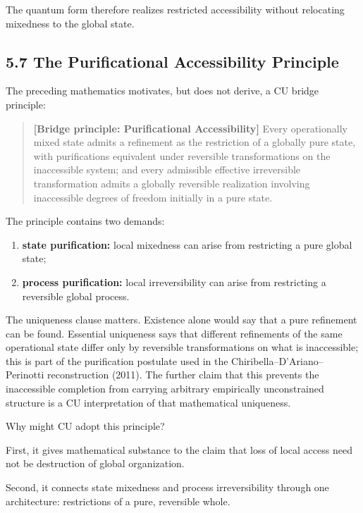 \documentclass[
  11pt,
]{article}
\providecommand{\tightlist}{%
  \setlength{\itemsep}{0pt}\setlength{\parskip}{0pt}}
\begin{document}
The quantum form therefore realizes restricted accessibility without
relocating mixedness to the global state.

\subsection{5.7 The Purificational Accessibility
Principle}\label{the-purificational-accessibility-principle}

The preceding mathematics motivates, but does not derive, a CU bridge
principle:

\begin{quote}
\textbf{{[}Bridge principle: Purificational Accessibility{]}} Every
operationally mixed state admits a refinement as the restriction of a
globally pure state, with purifications equivalent under reversible
transformations on the inaccessible system; and every admissible
effective irreversible transformation admits a globally reversible
realization involving inaccessible degrees of freedom initially in a
pure state.
\end{quote}

The principle contains two demands:

\begin{enumerate}
\def\labelenumi{\arabic{enumi}.}
\tightlist
\item
  \textbf{state purification:} local mixedness can arise from
  restricting a pure global state;
\item
  \textbf{process purification:} local irreversibility can arise from
  restricting a reversible global process.
\end{enumerate}

The uniqueness clause matters. Existence alone would say that a pure
refinement can be found. Essential uniqueness says that different
refinements of the same operational state differ only by reversible
transformations on what is inaccessible; this is part of the
purification postulate used in the Chiribella--D'Ariano--Perinotti
reconstruction (2011). The further claim that this prevents the
inaccessible completion from carrying arbitrary empirically
unconstrained structure is a CU interpretation of that mathematical
uniqueness.

Why might CU adopt this principle?

First, it gives mathematical substance to the claim that loss of local
access need not be destruction of global organization.

Second, it connects state mixedness and process irreversibility through
one architecture: restrictions of a pure, reversible whole.
\end{document}
